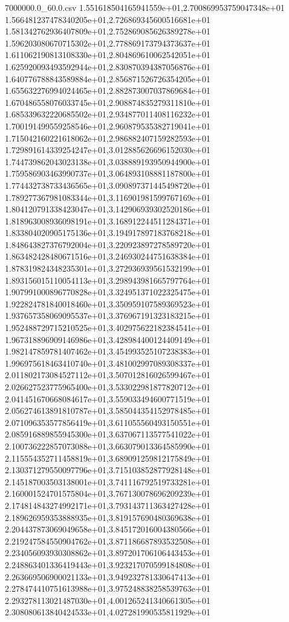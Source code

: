 \begin{filecontents*}{7000000.0_60.0.csv}
1.551618504165941559e+01,2.700869953759047348e+01
1.566481237478340205e+01,2.726869345600516681e+01
1.581342762936407809e+01,2.752869085626389278e+01
1.596203080670715302e+01,2.778869173794373637e+01
1.611062190813108330e+01,2.804869610062542051e+01
1.625920093493592944e+01,2.830870394387056876e+01
1.640776788843589884e+01,2.856871526726354205e+01
1.655632276994024465e+01,2.882873007037869684e+01
1.670486558076033745e+01,2.908874835279311810e+01
1.685339632220685502e+01,2.934877011408116232e+01
1.700191499559258546e+01,2.960879535382719041e+01
1.715042160221618062e+01,2.986882407159282593e+01
1.729891614339254247e+01,3.012885626696152030e+01
1.744739862043023138e+01,3.038889193950944900e+01
1.759586903463990737e+01,3.064893108881187800e+01
1.774432738733436565e+01,3.090897371445498720e+01
1.789277367981083344e+01,3.116901981599767169e+01
1.804120791338423047e+01,3.142906939302520186e+01
1.818963008936098191e+01,3.168912244511284371e+01
1.833804020905175136e+01,3.194917897183768218e+01
1.848643827376792004e+01,3.220923897278589720e+01
1.863482428480671516e+01,3.246930244751638384e+01
1.878319824348235301e+01,3.272936939561532199e+01
1.893156015110054113e+01,3.298943981665797764e+01
1.907991000896770828e+01,3.324951371022325475e+01
1.922824781840018460e+01,3.350959107589369523e+01
1.937657358069095537e+01,3.376967191323183215e+01
1.952488729715210525e+01,3.402975622182384541e+01
1.967318896909146986e+01,3.428984400124409149e+01
1.982147859781407462e+01,3.454993525107238383e+01
1.996975618463410740e+01,3.481002997089308337e+01
2.011802173084527112e+01,3.507012816026599467e+01
2.026627523775965400e+01,3.533022981877820712e+01
2.041451670668084617e+01,3.559033494600771519e+01
2.056274613891810787e+01,3.585044354152978485e+01
2.071096353577856419e+01,3.611055560493150551e+01
2.085916889855945300e+01,3.637067113577541022e+01
2.100736222857073088e+01,3.663079013364585990e+01
2.115554352711458819e+01,3.689091259812175849e+01
2.130371279550097796e+01,3.715103852877928148e+01
2.145187003503138001e+01,3.741116792519733281e+01
2.160001524701575804e+01,3.767130078696209239e+01
2.174814843274992171e+01,3.793143711363427428e+01
2.189626959353888935e+01,3.819157690480369638e+01
2.204437873069049658e+01,3.845172016004380566e+01
2.219247584550904762e+01,3.871186687893532508e+01
2.234056093930308862e+01,3.897201706106443453e+01
2.248863401336419443e+01,3.923217070599184808e+01
2.263669506900021133e+01,3.949232781330647413e+01
2.278474410751613988e+01,3.975248838258539763e+01
2.293278113021487030e+01,4.001265241340661305e+01
2.308080613840424533e+01,4.027281990535811929e+01

\end{filecontents*}
